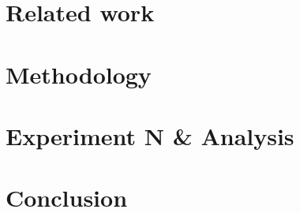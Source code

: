 \section{Related work}\label{sec:relatedwork}





\section{Methodology}

\section{Experiment N \& Analysis}


\section{Conclusion}





\appendix
%


